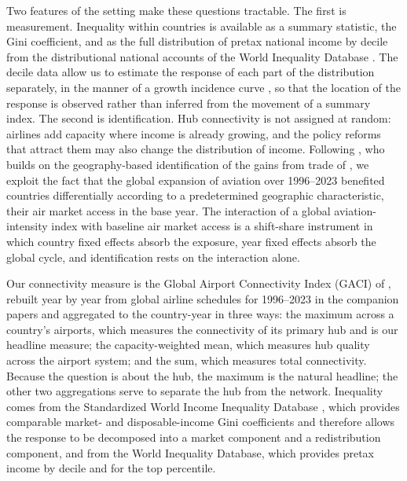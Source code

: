 Two features of the setting make these questions tractable. The first is measurement. Inequality within countries is available as a summary statistic, the Gini coefficient, and as the full distribution of pretax national income by decile from the distributional national accounts of the World Inequality Database \citep{Piketty_2017,WID_2024}. The decile data allow us to estimate the response of each part of the distribution separately, in the manner of a growth incidence curve \citep{Ravallion_2003}, so that the location of the response is observed rather than inferred from the movement of a summary index. The second is identification. Hub connectivity is not assigned at random: airlines add capacity where income is already growing, and the policy reforms that attract them may also change the distribution of income. Following \citet{Feyrer_2019}, who builds on the geography-based identification of the gains from trade of \citet{Frankel_1999}, we exploit the fact that the global expansion of aviation over 1996--2023 benefited countries differentially according to a predetermined geographic characteristic, their air market access in the base year. The interaction of a global aviation-intensity index with baseline air market access is a shift-share instrument \citep{GoldsmithPinkham_2020,Adao_2019,Borusyak_2022} in which country fixed effects absorb the exposure, year fixed effects absorb the global cycle, and identification rests on the interaction alone.

Our connectivity measure is the Global Airport Connectivity Index (GACI) of \citet{Cheung_2020}, rebuilt year by year from global airline schedules for 1996--2023 in the companion papers and aggregated to the country-year in three ways: the maximum across a country's airports, which measures the connectivity of its primary hub and is our headline measure; the capacity-weighted mean, which measures hub quality across the airport system; and the sum, which measures total connectivity. Because the question is about the hub, the maximum is the natural headline; the other two aggregations serve to separate the hub from the network. Inequality comes from the Standardized World Income Inequality Database \citep{Solt_2020}, which provides comparable market- and disposable-income Gini coefficients and therefore allows the response to be decomposed into a market component and a redistribution component, and from the World Inequality Database, which provides pretax income by decile and for the top percentile.

